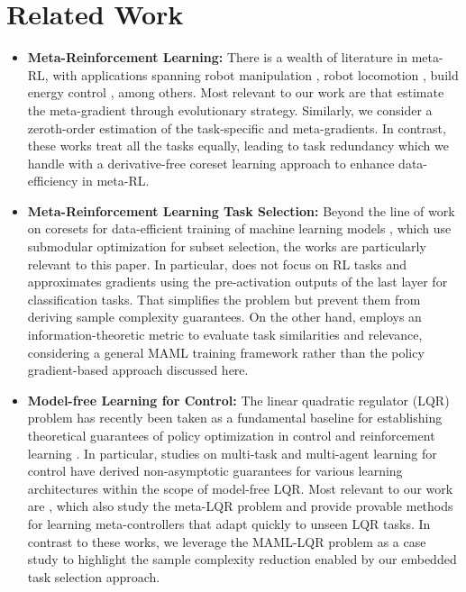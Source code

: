 \section{Related Work}
\label{sec:related}

\begin{itemize}
\item \textbf{Meta-Reinforcement Learning:} There is a wealth of literature in meta-RL, with applications spanning robot manipulation \citep{yu2017preparing,arndt2020meta,ghadirzadeh2021bayesian}, robot locomotion \citep{song2020rapidly,yu2020learning}, build energy control \citep{luna2020information}, among others. Most relevant to our work are \cite{song2019maml,song2020rapidly} that estimate the meta-gradient through evolutionary strategy. Similarly, we consider a zeroth-order estimation of the task-specific and meta-gradients. In contrast, these works treat all the tasks equally, leading to task redundancy which we handle with a derivative-free coreset learning approach to enhance data-efficiency in meta-RL. 

\vspace{-0.2cm}
\item \textbf{Meta-Reinforcement Learning Task Selection:} Beyond the line of work on coresets for data-efficient training of machine learning models \citep{mirzasoleiman2020coresets1,killamsetty2021grad, yang2023towards, pooladzandi2022adaptive, balakrishnan2022diverse}, which use submodular optimization for subset selection, the works \citep{luna2020information,zhan2024data} are particularly relevant to this paper. In particular, \cite{zhan2024data} does not focus on RL tasks and approximates gradients using the pre-activation outputs of the last layer for classification tasks. That simplifies the problem but prevent them from deriving sample complexity guarantees. On the other hand, \cite{shin2023task} employs an information-theoretic metric to evaluate task similarities and relevance, considering a general MAML training framework rather than the policy gradient-based approach discussed here.

\vspace{-0.2cm}
\item \textbf{Model-free Learning for Control:} The linear quadratic regulator (LQR) problem has recently been taken as a fundamental baseline for establishing theoretical guarantees of policy optimization in control and reinforcement learning \citep{fazel2018global}. In particular, studies on multi-task and multi-agent learning for control \citep{zhang2023multi,wang2023model,tang2023zeroth,toso2024asynchronous,toso2024meta,lee2024nonasymptotic,lee2024regret} have derived non-asymptotic guarantees for various learning architectures within the scope of model-free LQR. Most relevant to our work are \cite{molybog2021does,musavi2023convergence,toso2024meta,aravind2024moreau,pan2024model}, which also study the meta-LQR problem and provide provable methods for learning meta-controllers that adapt quickly to unseen LQR tasks. In contrast to these works, we leverage the MAML-LQR problem as a case study to highlight the sample complexity reduction enabled by our embedded task selection approach.
\end{itemize}